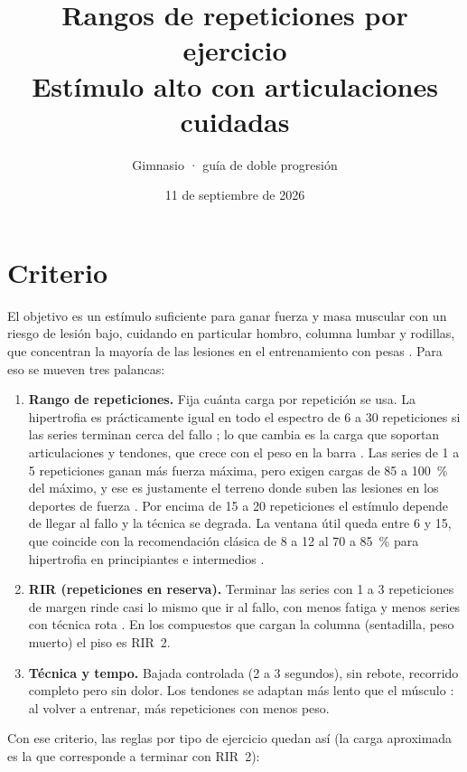 \documentclass[11pt,a4paper]{article}
\title{\textbf{Rangos de repeticiones por ejercicio}\\[4pt]\large Estímulo alto con articulaciones cuidadas}
\author{Gimnasio · guía de doble progresión}
\date{11 de septiembre de 2026}
\begin{document}
\maketitle

\section{Criterio}

El objetivo es un estímulo suficiente para ganar fuerza y masa muscular con un riesgo de lesión bajo, cuidando en particular hombro, columna lumbar y rodillas, que concentran la mayoría de las lesiones en el entrenamiento con pesas \cite{keogh2017,kolber2010}. Para eso se mueven tres palancas:

\begin{enumerate}
  \item \textbf{Rango de repeticiones.} Fija cuánta carga por repetición se usa. La hipertrofia es prácticamente igual en todo el espectro de 6 a 30 repeticiones si las series terminan cerca del fallo \cite{schoenfeld2017,schoenfeld2021,lopez2021}; lo que cambia es la carga que soportan articulaciones y tendones, que crece con el peso en la barra \cite{escamilla2001,cholewicki1991}. Las series de 1 a 5 repeticiones ganan más fuerza máxima, pero exigen cargas de 85 a 100~\% del máximo, y ese es justamente el terreno donde suben las lesiones en los deportes de fuerza \cite{keogh2017}. Por encima de 15 a 20 repeticiones el estímulo depende de llegar al fallo y la técnica se degrada. La ventana útil queda entre 6 y 15, que coincide con la recomendación clásica de 8 a 12 al 70 a 85~\% para hipertrofia en principiantes e intermedios \cite{acsm2009}.
  \item \textbf{RIR (repeticiones en reserva).} Terminar las series con 1 a 3 repeticiones de margen rinde casi lo mismo que ir al fallo, con menos fatiga y menos series con técnica rota \cite{refalo2023,grgic2022,helms2016}. En los compuestos que cargan la columna (sentadilla, peso muerto) el piso es RIR~2.
  \item \textbf{Técnica y tempo.} Bajada controlada (2 a 3 segundos), sin rebote, recorrido completo pero sin dolor. Los tendones se adaptan más lento que el músculo \cite{magnusson2019}: al volver a entrenar, más repeticiones con menos peso.
\end{enumerate}

Con ese criterio, las reglas por tipo de ejercicio quedan así (la carga aproximada es la que corresponde a terminar con RIR~2):
\end{document}
